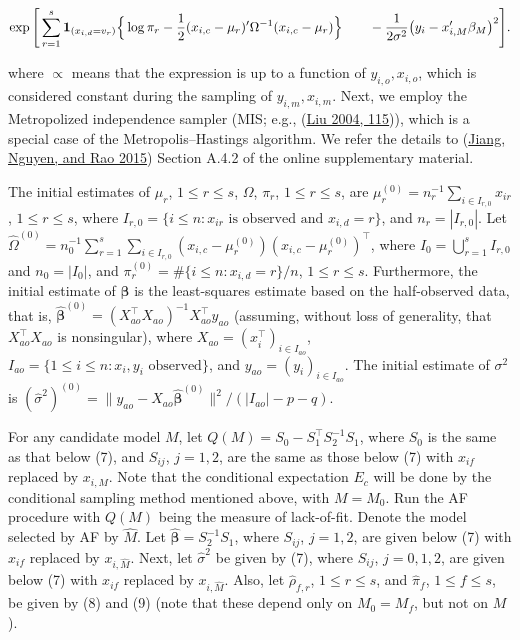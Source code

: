 \documentclass[
  12pt,
]{article}
\begin{document}
\begin{equation*} 
\exp \Bigg[
\sum_{r=1}^{s} \mathbf{1}_{(x_{i,d}=v_r)}
\Big\{
\log \pi_r
- \frac{1}{2} (x_{i,c} - \mu_r)' \Omega^{-1} (x_{i,c} - \mu_r)
\Big\} \\
\qquad
- \frac{1}{2\sigma^2} \big( y_i - x_{i,M}' \beta_M \big)^2
\Bigg].
\end{equation*}

where \(\propto\) means that the expression is up to a function of
\(y_{i,o}, x_{i,o}\), which is considered constant during the sampling
of \(y_{i,m}, x_{i,m}\). Next, we employ the Metropolized independence
sampler (MIS; e.g., (\protect\hyperlink{ref-Liu2004MonteCarlo}{Liu 2004,
115})), which is a special case of the Metropolis--Hastings algorithm.
We refer the details to (\protect\hyperlink{ref-Sunilems}{Jiang, Nguyen,
and Rao 2015}) Section A.4.2 of the online supplementary material.

The initial estimates of \(\mu_r\), \(1 \le r \le s\), \(\Omega\),
\(\pi_r\), \(1 \le r \le s\), are
\(\mu_r^{(0)} = n_r^{-1} \sum_{i \in I_{r,0}} x_{ir}\),
\(1 \le r \le s\), where
\(I_{r,0} = \{ i \le n : x_{ir} \text{ is observed and } x_{i,d} = r \}\),
and \(n_r = |I_{r,0}|\). Let
\(\hat{\Omega}^{(0)} = n_0^{-1} \sum_{r=1}^s \sum_{i \in I_{r,0}} (x_{i,c} - \mu_r^{(0)})(x_{i,c} - \mu_r^{(0)})^\top\),
where \(I_0 = \bigcup_{r=1}^s I_{r,0}\) and \(n_0 = |I_0|\), and
\(\pi_r^{(0)} = \#\{ i \le n : x_{i,d} = r \} / n\), \(1 \le r \le s\).
Furthermore, the initial estimate of \(\boldsymbol{\beta}\) is the
least-squares estimate based on the half-observed data, that is,
\(\hat{\boldsymbol{\beta}}^{(0)} = (X_{ao}^\top X_{ao})^{-1} X_{ao}^\top y_{ao}\)
(assuming, without loss of generality, that \(X_{ao}^\top X_{ao}\) is
nonsingular), where \(X_{ao} = (x_i^\top)_{i \in I_{ao}}\),
\(I_{ao} = \{ 1 \le i \le n : x_i, y_i \text{ observed} \}\), and
\(y_{ao} = (y_i)_{i \in I_{ao}}\). The initial estimate of \(\sigma^2\)
is
\((\hat{\sigma}^2)^{(0)} = \| y_{ao} - X_{ao} \hat{\boldsymbol{\beta}}^{(0)} \|^2 / (|I_{ao}| - p - q)\).

For any candidate model \(M\), let
\(Q(M) = S_0 - S_1^\top S_2^{-1} S_1\), where \(S_0\) is the same as
that below (7), and \(S_{ij}\), \(j = 1, 2\), are the same as those
below (7) with \(x_{if}\) replaced by \(x_{i,M}\). Note that the
conditional expectation \(E_c\) will be done by the conditional sampling
method mentioned above, with \(M = M_0\). Run the AF procedure with
\(Q(M)\) being the measure of lack-of-fit. Denote the model selected by
AF by \(\hat{M}\). Let \(\hat{\boldsymbol{\beta}} = S_2^{-1} S_1\),
where \(S_{ij}\), \(j = 1, 2\), are given below (7) with \(x_{if}\)
replaced by \(x_{i,\hat{M}}\). Next, let \(\hat{\sigma}^2\) be given by
(7), where \(S_{ij}\), \(j = 0, 1, 2\), are given below (7) with
\(x_{if}\) replaced by \(x_{i,\hat{M}}\). Also, let
\(\hat{\rho}_{f,r}\), \(1 \le r \le s\), and \(\hat{\pi}_f\),
\(1 \le f \le s\), be given by (8) and (9) (note that these depend only
on \(M_0 = M_f\), but not on \(M\)).
\end{document}
